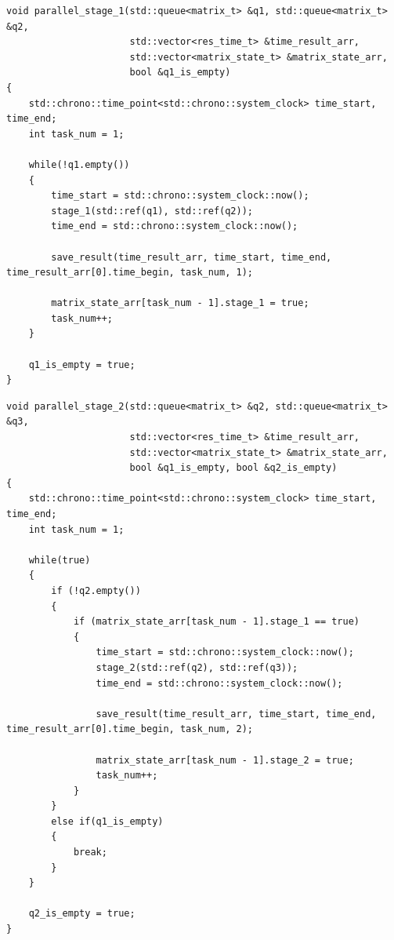 \documentclass[a4paper,14pt, unknownkeysallowed]{extreport}
\begin{document}
\begin{center}
\captionsetup{justification=raggedright,singlelinecheck=off}
\begin{lstlisting}[label=lst:parallel_stage_1,caption=Функция 1-ой ленты конвейерной обработки матрицы]
void parallel_stage_1(std::queue<matrix_t> &q1, std::queue<matrix_t> &q2,
                      std::vector<res_time_t> &time_result_arr,
                      std::vector<matrix_state_t> &matrix_state_arr, 
                      bool &q1_is_empty)
{
    std::chrono::time_point<std::chrono::system_clock> time_start, time_end;
    int task_num = 1;

    while(!q1.empty())
    {   
        time_start = std::chrono::system_clock::now();
        stage_1(std::ref(q1), std::ref(q2));
        time_end = std::chrono::system_clock::now();

        save_result(time_result_arr, time_start, time_end, time_result_arr[0].time_begin, task_num, 1);

        matrix_state_arr[task_num - 1].stage_1 = true;
        task_num++;
    }

    q1_is_empty = true;
}
\end{lstlisting}
\end{center}

\clearpage

\begin{center}
\captionsetup{justification=raggedright,singlelinecheck=off}
\begin{lstlisting}[label=lst:parallel_stage_2,caption=Функция 2-ой ленты конвейерной обработки матрицы]
void parallel_stage_2(std::queue<matrix_t> &q2, std::queue<matrix_t> &q3,
                      std::vector<res_time_t> &time_result_arr,
                      std::vector<matrix_state_t> &matrix_state_arr, 
                      bool &q1_is_empty, bool &q2_is_empty)
{
    std::chrono::time_point<std::chrono::system_clock> time_start, time_end;
    int task_num = 1;

    while(true)
    {      
        if (!q2.empty())
        {   
            if (matrix_state_arr[task_num - 1].stage_1 == true)
            {
                time_start = std::chrono::system_clock::now();
                stage_2(std::ref(q2), std::ref(q3));
                time_end = std::chrono::system_clock::now();

                save_result(time_result_arr, time_start, time_end, time_result_arr[0].time_begin, task_num, 2);

                matrix_state_arr[task_num - 1].stage_2 = true;
                task_num++;
            }
        }
        else if(q1_is_empty)
        {
            break;
        }
    }

    q2_is_empty = true;
}
\end{lstlisting}
\end{center}
\end{document}
